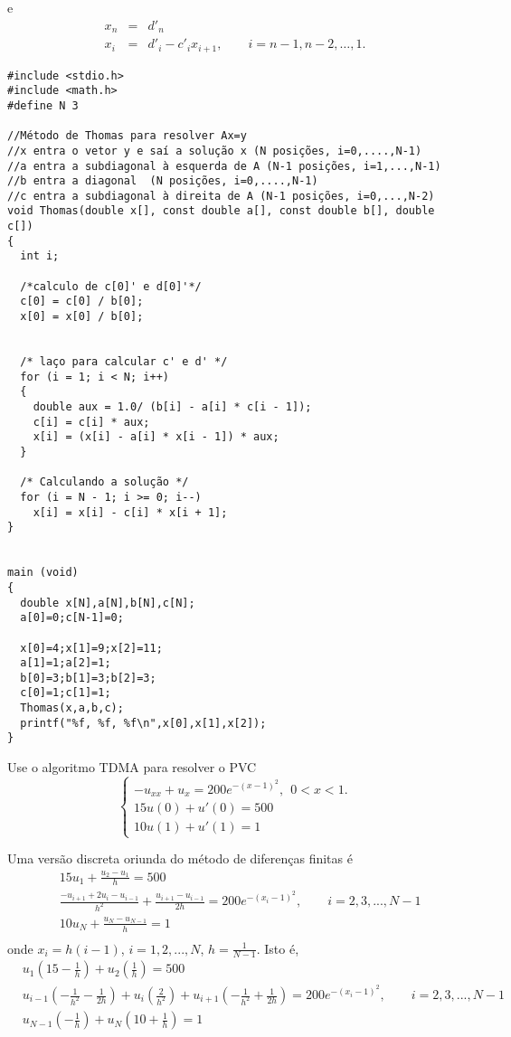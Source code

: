 e
\begin{eqnarray*}\label{linsis:TriDiag_2.2}
x_n &=& d'_n\\
 x_i &=& d'_i - c'_i x_{i + 1}, \qquad   i = n - 1, n - 2, \ldots, 1.
\end{eqnarray*}
\begin{verbatim}
#include <stdio.h>
#include <math.h>
#define N 3

//Método de Thomas para resolver Ax=y
//x entra o vetor y e saí a solução x (N posições, i=0,....,N-1)
//a entra a subdiagonal à esquerda de A (N-1 posições, i=1,...,N-1)
//b entra a diagonal  (N posições, i=0,....,N-1)
//c entra a subdiagonal à direita de A (N-1 posições, i=0,...,N-2)
void Thomas(double x[], const double a[], const double b[], double c[]) 
{
  int i;

  /*calculo de c[0]' e d[0]'*/
  c[0] = c[0] / b[0];
  x[0] = x[0] / b[0];


  /* laço para calcular c' e d' */
  for (i = 1; i < N; i++) 
  {
    double aux = 1.0/ (b[i] - a[i] * c[i - 1]);
    c[i] = c[i] * aux;
    x[i] = (x[i] - a[i] * x[i - 1]) * aux;
  }

  /* Calculando a solução */
  for (i = N - 1; i >= 0; i--)
    x[i] = x[i] - c[i] * x[i + 1];
}


main (void)
{
  double x[N],a[N],b[N],c[N];
  a[0]=0;c[N-1]=0;

  x[0]=4;x[1]=9;x[2]=11;
  a[1]=1;a[2]=1;
  b[0]=3;b[1]=3;b[2]=3;
  c[0]=1;c[1]=1;
  Thomas(x,a,b,c);
  printf("%f, %f, %f\n",x[0],x[1],x[2]);
}
\end{verbatim}
\begin{ex}\label{ex_PVC_TDMA} Use o algoritmo TDMA para resolver o PVC
$$\left\{\begin{array}{l}-u_{xx}+u_x=200e^{-(x-1)^2},~~ 0<x<1.\\
15u(0)+u'(0)=500\\
10u(1)+u'(1)=1\end{array}
\right.
$$
\end{ex}
Uma versão discreta oriunda do método de diferenças finitas é
\begin{align*}
 &15u_1+\frac{u_2-u_1}{h}=500\\
 &\frac{-u_{i+1}+2u_i-u_{i-1}}{h^2}+\frac{u_{i+1}-u_{i-1}}{2h}=200e^{-(x_i-1)^2},\qquad i=2,3,...,N-1\\
 &10u_N+\frac{u_N-u_{N-1}}{h}=1\\
\end{align*}
onde $x_i=h(i-1)$, $i=1,2,...,N$, $h=\frac{1}{N-1}$. Isto é,
\begin{align*}
 &u_1\left(15-\frac{1}{h}\right)+u_2\left(\frac{1}{h}\right)=500\\
 &u_{i-1}\left(-\frac{1}{h^2}-\frac{1}{2h}\right)+u_{i}\left(\frac{2}{h^2}\right)+u_{i+1}\left(-\frac{1}{h^2}+\frac{1}{2h}\right)=200e^{-(x_i-1)^2},\qquad i=2,3,...,N-1\\
 &u_{N-1}\left(-\frac{1}{h}\right)+u_N\left(10+\frac{1}{h}\right)=1\\
\end{align*}
